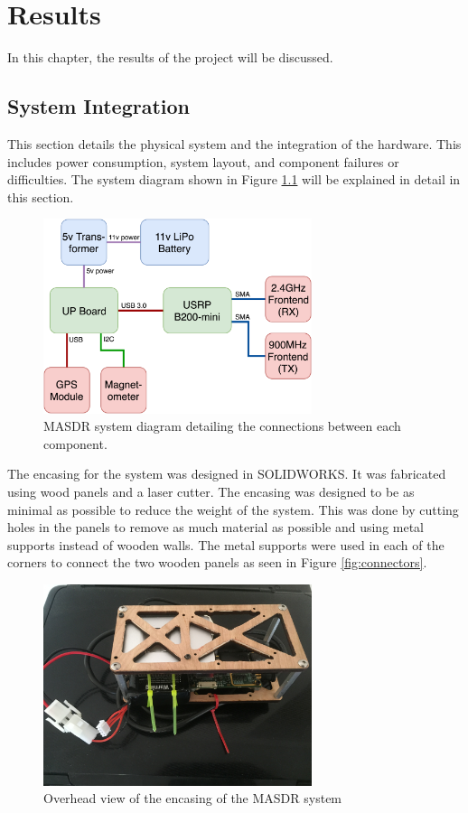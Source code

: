 \chapter{Results}
In this chapter, the results of the project will be discussed.

\section{System Integration}
This section details the physical system and the integration of the hardware. This includes power consumption, system layout, and component failures or difficulties. The system diagram shown in Figure \ref{fig:masdr_system_diagram} will be explained in detail in this section.
\begin{figure}[ht!]
	\centering
	\includegraphics[width=0.70\textwidth]{img/masdr_system_diagram.png}
	\caption{MASDR system diagram detailing the connections between each component.}
	\label{fig:masdr_system_diagram}
\end{figure}\par
The encasing for the system was designed in SOLIDWORKS. It was fabricated using wood panels and a laser cutter. The encasing was designed to be as minimal as possible to reduce the weight of the system. This was done by cutting holes in the panels to remove as much material as possible and using metal supports instead of wooden walls. The metal supports were used in each of the corners to connect the two wooden panels as seen in Figure \ref{fig:connectors}.
\begin{figure}[ht!]
	\centering
	\includegraphics[width=0.70\textwidth]{img/Overhead_of_box.JPG}
	\caption{Overhead view of the encasing of the MASDR system}
	\label{fig:overhead_of_box}
\end{figure}\par
